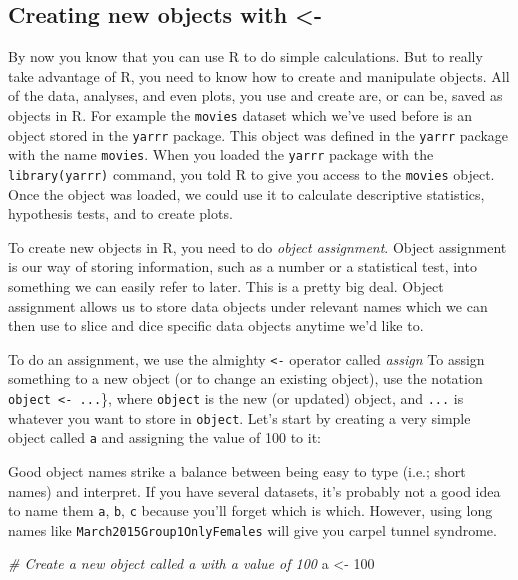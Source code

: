 \documentclass[]{book}
\newenvironment{Shaded}{\begin{snugshade}}{\end{snugshade}}
\newcommand{\DecValTok}[1]{\textcolor[rgb]{0.00,0.00,0.81}{{#1}}}
\newcommand{\StringTok}[1]{\textcolor[rgb]{0.31,0.60,0.02}{{#1}}}
\newcommand{\CommentTok}[1]{\textcolor[rgb]{0.56,0.35,0.01}{\textit{{#1}}}}
\newcommand{\NormalTok}[1]{{#1}}
\theoremstyle{definition}
\theoremstyle{definition}
\theoremstyle{remark}
\begin{document}
\subsection{Creating new objects with
\textless{}-}\label{creating-new-objects-with--}

By now you know that you can use R to do simple calculations. But to
really take advantage of R, you need to know how to create and
manipulate objects. All of the data, analyses, and even plots, you use
and create are, or can be, saved as objects in R. For example the
\texttt{movies} dataset which we've used before is an object stored in
the \texttt{yarrr} package. This object was defined in the
\texttt{yarrr} package with the name \texttt{movies}. When you loaded
the \texttt{yarrr} package with the
\texttt{library(\textquotesingle{}yarrr\textquotesingle{})} command, you
told R to give you access to the \texttt{movies} object. Once the object
was loaded, we could use it to calculate descriptive statistics,
hypothesis tests, and to create plots.

To create new objects in R, you need to do \emph{object assignment}.
Object assignment is our way of storing information, such as a number or
a statistical test, into something we can easily refer to later. This is
a pretty big deal. Object assignment allows us to store data objects
under relevant names which we can then use to slice and dice specific
data objects anytime we'd like to.

To do an assignment, we use the almighty \texttt{\textless{}-} operator
called \emph{assign} To assign something to a new object (or to change
an existing object), use the notation
\texttt{object\ \textless{}-\ ...}\}, where \texttt{object} is the new
(or updated) object, and \texttt{...} is whatever you want to store in
\texttt{object}. Let's start by creating a very simple object called
\texttt{a} and assigning the value of 100 to it:

Good object names strike a balance between being easy to type (i.e.;
short names) and interpret. If you have several datasets, it's probably
not a good idea to name them \texttt{a}, \texttt{b}, \texttt{c} because
you'll forget which is which. However, using long names like
\texttt{March2015Group1OnlyFemales} will give you carpel tunnel
syndrome.

\begin{Shaded}
\begin{Highlighting}[]
\CommentTok{# Create a new object called a with a value of 100}
\NormalTok{a <-}\StringTok{ }\DecValTok{100}
\end{Highlighting}
\end{Shaded}
\end{document}
